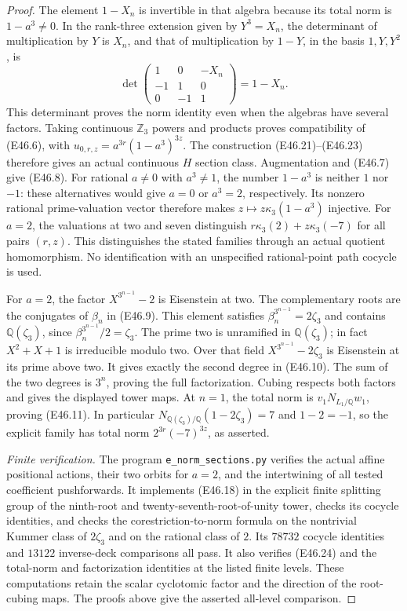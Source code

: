 \begin{proof}
The element $1-X_n$ is invertible in that algebra
because its total norm is $1-a^3\ne0$.
In the rank-three extension given by $Y^3=X_n$,
the determinant of multiplication by $Y$ is $X_n$,
and that of multiplication by $1-Y$,
in the basis $1,Y,Y^2$, is
\[
 \det\begin{pmatrix}
       1&0&-X_n\\-1&1&0\\0&-1&1
      \end{pmatrix}=1-X_n.
 \tag{E46.24}
\]
This determinant proves the norm identity even
when the algebras have several factors. Taking
continuous $\mathbb Z_3$ powers and products proves
compatibility of (E46.6), with
$u_{0,r,z}=a^{3r}(1-a^3)^{3z}$.
The construction (E46.21)--(E46.23) therefore
gives an actual continuous $H$ section class.
Augmentation and (E46.7) give (E46.8).
For rational $a\ne0$ with $a^3\ne1$, the number
$1-a^3$ is neither $1$ nor $-1$: these alternatives
would give $a=0$ or $a^3=2$, respectively.
Its nonzero rational prime-valuation vector
therefore makes $z\mapsto z\kappa_3(1-a^3)$
injective. For $a=2$, the valuations at two and
seven distinguish $r\kappa_3(2)+z\kappa_3(-7)$
for all pairs $(r,z)$. This distinguishes the
stated families through an actual quotient homomorphism.
No identification with an unspecified
rational-point path cocycle is used.

For $a=2$, the factor $X^{3^{n-1}}-2$ is
Eisenstein at two. The complementary roots
are the conjugates of $\beta_n$ in (E46.9).
This element satisfies
$\beta_n^{3^{n-1}}=2\zeta_3$ and contains
$\mathbb Q(\zeta_3)$, since
$\beta_n^{3^{n-1}}/2=\zeta_3$.
The prime two is unramified in
$\mathbb Q(\zeta_3)$; in fact $X^2+X+1$ is
irreducible modulo two. Over that field
$X^{3^{n-1}}-2\zeta_3$ is Eisenstein at its
prime above two. It gives exactly the second
degree in (E46.10). The sum of the two
degrees is $3^n$, proving the full factorization.
Cubing respects both factors and gives the
displayed tower maps. At $n=1$, the total norm
is $v_1N_{L_1/\mathbb Q}w_1$, proving
(E46.11). In particular
$N_{\mathbb Q(\zeta_3)/\mathbb Q}(1-2\zeta_3)=7$
and $1-2=-1$, so the explicit family has
total norm $2^{3r}(-7)^{3z}$, as asserted.

\emph{Finite verification.}
The program \texttt{e\_norm\_sections.py} verifies
the actual affine positional actions, their two
orbits for $a=2$, and the intertwining of all
tested coefficient pushforwards. It implements
(E46.18) in the explicit finite splitting group
of the ninth-root and twenty-seventh-root-of-unity
tower, checks its cocycle identities, and checks
the corestriction-to-norm formula on the nontrivial
Kummer class of $2\zeta_3$ and on the rational
class of $2$. Its $78732$ cocycle identities and
$13122$ inverse-deck comparisons all pass. It also
verifies (E46.24) and the
total-norm and factorization identities at the
listed finite levels. These computations retain
the scalar cyclotomic factor and the direction
of the root-cubing maps. The proofs above give
the asserted all-level comparison.
\end{proof}
